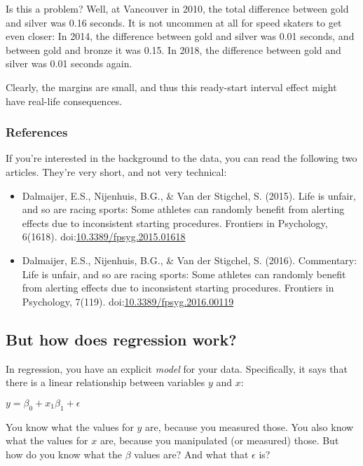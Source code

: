 \documentclass[11pt]{article}
\providecommand{\tightlist}{%
      \setlength{\itemsep}{0pt}\setlength{\parskip}{0pt}}
\begin{document}
    Is this a problem? Well, at Vancouver in 2010, the total difference
between gold and silver was 0.16 seconds. It is not uncommen at all for
speed skaters to get even closer: In 2014, the difference between gold
and silver was 0.01 seconds, and between gold and bronze it was 0.15. In
2018, the difference between gold and silver was 0.01 seconds again.

Clearly, the margins are small, and thus this ready-start interval
effect might have real-life consequences.

    \subsubsection{References}\label{references}

If you're interested in the background to the data, you can read the
following two articles. They're very short, and not very technical:

\begin{itemize}
\tightlist
\item
  Dalmaijer, E.S., Nijenhuis, B.G., \& Van der Stigchel, S. (2015). Life
  is unfair, and so are racing sports: Some athletes can randomly
  benefit from alerting effects due to inconsistent starting procedures.
  Frontiers in Psychology, 6(1618).
  doi:\href{http://dx.doi.org/10.3389/fpsyg.2015.01618}{10.3389/fpsyg.2015.01618}
\item
  Dalmaijer, E.S., Nijenhuis, B.G., \& Van der Stigchel, S. (2016).
  Commentary: Life is unfair, and so are racing sports: Some athletes
  can randomly benefit from alerting effects due to inconsistent
  starting procedures. Frontiers in Psychology, 7(119).
  doi:\href{http://dx.doi.org/10.3389/fpsyg.2016.00119}{10.3389/fpsyg.2016.00119}
\end{itemize}

    \subsection{But how does regression
work?}\label{but-how-does-regression-work}

In regression, you have an explicit \emph{model} for your data.
Specifically, it says that there is a linear relationship between
variables \(y\) and \(x\):

\(y = \beta_{0} + x_{1} \beta_{1} + \epsilon\)

You know what the values for \(y\) are, because you measured those. You
also know what the values for \(x\) are, because you manipulated (or
measured) those. But how do you know what the \(\beta\) values are? And
what that \(\epsilon\) is?
\end{document}
